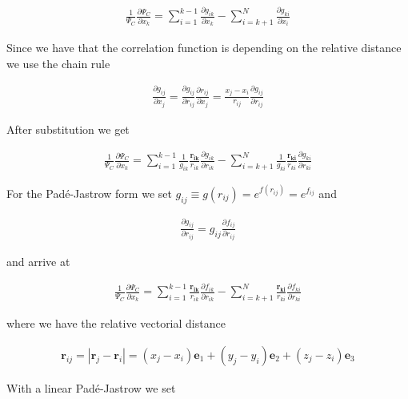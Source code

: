 \documentclass[11pt]{article}
\begin{document}
			\begin{align}
				\frac{1}{\Psi_{C}}\frac{\partial\Psi_{C}}{\partial x_{k}}=\sum_{i=1}^{k-1}\frac{\partial g_{ik}}{\partial x_{k}}-\sum_{i=k+1}^{N}\frac{\partial g_{ki}}{\partial x_{i}}
			\end{align}


			Since we have that the correlation function is depending on the relative
			distance we use the chain rule

			\begin{align}
				\frac{\partial g_{ij}}{\partial x_{j}}=\frac{\partial g_{ij}}{\partial r_{ij}}\frac{\partial r_{ij}}{\partial x_{j}}=\frac{x_{j}-x_{i}}{r_{ij}}\frac{\partial g_{ij}}{\partial r_{ij}}
			\end{align}

			After substitution we get

			\begin{align}
				\frac{1}{\Psi_{C}}\frac{\partial\Psi_{C}}{\partial x_{k}}=\sum_{i=1}^{k-1}\frac{1}{g_{ik}}\frac{\mathbf{r_{ik}}}{r_{ik}}\frac{\partial g_{ik}}{\partial r_{ik}}-\sum_{i=k+1}^{N}\frac{1}{g_{ki}}\frac{\mathbf{r_{ki}}}{r_{ki}}\frac{\partial g_{ki}}{\partial r_{ki}}
			\end{align}

			For the Padé-Jastrow form we set $\ensuremath{g_{ij}\equiv g(r_{ij})=e^{f(r_{ij})}=e^{f_{ij}}}$
			and

			\begin{align}
				\frac{\partial g_{ij}}{\partial r_{ij}}=g_{ij}\frac{\partial f_{ij}}{\partial r_{ij}}
			\end{align}

			and arrive at

			\begin{align}
				\frac{1}{\Psi_{C}}\frac{\partial\Psi_{C}}{\partial x_{k}}=\sum_{i=1}^{k-1}\frac{\mathbf{r_{ik}}}{r_{ik}}\frac{\partial f_{ik}}{\partial r_{ik}}-\sum_{i=k+1}^{N}\frac{\mathbf{r_{ki}}}{r_{ki}}\frac{\partial f_{ki}}{\partial r_{ki}} \label{eq:gradient_ratio_Jastrow}
			\end{align}

			where we have the relative vectorial distance

			\begin{align}
				\mathbf{r}_{ij}=|\mathbf{r}_{j}-\mathbf{r}_{i}|=(x_{j}-x_{i})\mathbf{e}_{1}+(y_{j}-y_{i})\mathbf{e}_{2}+(z_{j}-z_{i})\mathbf{e}_{3}
			\end{align}

			With a linear Padé-Jastrow we set
\end{document}
